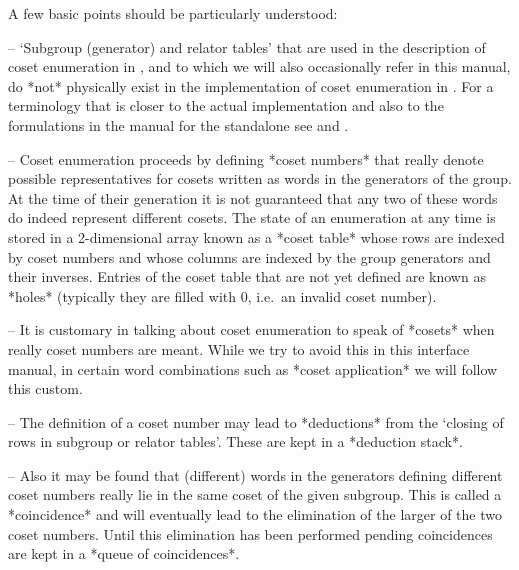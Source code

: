 A few basic points should be particularly understood:

\beginlist

\item{--} \lq{}Subgroup (generator) and relator tables' that are  used
in the description of coset enumeration in \cite{Neu82}, and to  which
we will also occasionally refer in this manual,  do  *not*  physically
exist in the implementation of coset  enumeration  in  {\ACE}.  For  a
terminology that is closer to the actual implementation  and  also  to
the  formulations  in  the  manual  for  the  {\ACE}  standalone   see
\cite{CDHW73} and \cite{Hav91}.

\item{--} Coset    enumeration    proceeds    by    defining    *coset
numbers*   that    really    denote    possible
representatives for cosets written as words in the generators  of  the
group. At the time of their generation it is not guaranteed  that  any
two of these words do indeed represent different cosets. The state  of
an enumeration at any time is stored in a 2-dimensional array known as
a *coset table* whose rows  are  indexed  by  coset
numbers and whose columns are indexed  by  the  group  generators  and
their inverses. Entries of the coset table that are  not  yet  defined
are known as *holes* (typically they are filled  with  0,
i.e.~an invalid coset number).

\item{--} It is customary in  talking about coset enumeration to speak
of *cosets* when really coset numbers are  meant.  While
we try to avoid  this  in  this  interface  manual,  in  certain  word
combinations such as *coset application*  we
will follow this custom.

\item{--} The   definition   of   a   coset   number   may   lead   to
*deductions*  from  the  \lq{}closing  of   rows   in
subgroup  or  relator  tables'.  These  are  kept  in   a   *deduction
stack*.

\item{--} Also   it  may  be  found  that  (different)  words  in  the
generators defining different coset numbers really  lie  in  the  same
coset    of    the    given    subgroup.    This    is    called     a
*coincidence*  and  will  eventually  lead  to  the
elimination of the  larger  of  the  two  coset  numbers.  Until  this
elimination has been performed pending  coincidences  are  kept  in  a
*queue of coincidences*.

